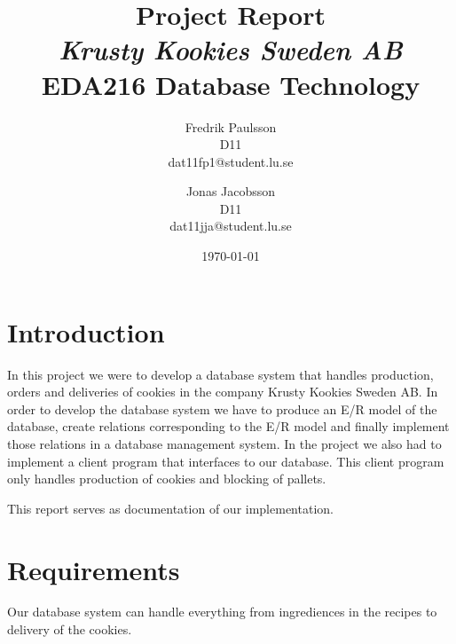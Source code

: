 \documentclass[a4paper]{article}
\title{Project Report \\ \emph{Krusty Kookies Sweden AB} \\ EDA216 Database Technology}
\date{\today}
\author{Fredrik Paulsson \\ D11 \\ dat11fp1@student.lu.se \and Jonas Jacobsson \\ D11 \\ dat11jja@student.lu.se}
\begin{document}
\maketitle
\newpage


\section{Introduction}
In this project we were to develop a database system that handles production, orders and deliveries of cookies in the company Krusty Kookies Sweden AB. In order to develop the database system we have to produce an E/R model of the database, create relations corresponding to the E/R model and finally implement those relations in a database management system. In the project we also had to implement a client program that interfaces to our database. This client program only handles production of cookies and blocking of pallets.

This report serves as documentation of our implementation.

\section{Requirements}
Our database system can handle everything from ingrediences in the recipes to delivery of the cookies.
\end{document}
